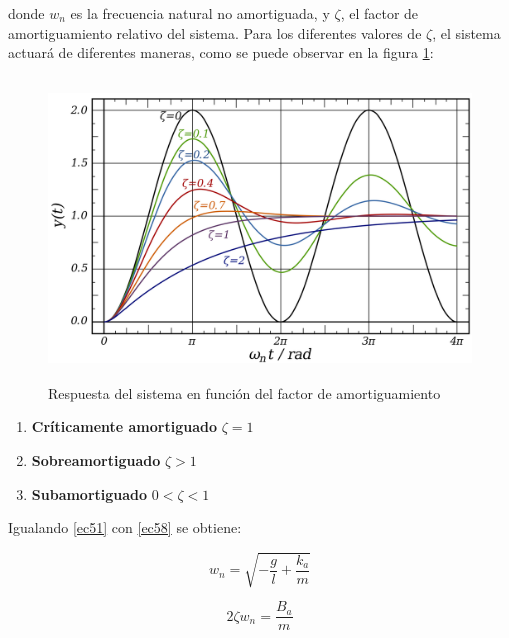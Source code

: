 \begin{itemize}
donde $w_{n}$ es la frecuencia natural no amortiguada, y $\zeta$, el factor de amortiguamiento relativo del sistema. Para los diferentes valores de $\zeta$, el sistema actuará de diferentes maneras, como se puede observar en la figura \ref{figura59}:

\begin{figure}[H]
\centering
\includegraphics[width=13cm, height=8cm]{imagenes/apartado_5/59_zeta_response_system}
\caption{Respuesta del sistema en función del factor de amortiguamiento}
\label{figura59}
\end{figure}


\begin{enumerate}

\item \textbf{Críticamente amortiguado} $\zeta = 1$

\item \textbf{Sobreamortiguado} $\zeta > 1$

\item \textbf{Subamortiguado} $0 < \zeta < 1$

\end{enumerate}

Igualando \ref{ec51} con \ref{ec58} se obtiene:

\begin{equation}
w_{n}=\sqrt{-\frac{g}{l}+\frac{k_a}{m}}
\label{ec59}
\end{equation}

\begin{equation}
2\zeta w_{n} = \frac{B_a}{m}
\label{ec510}
\end{equation}


\end{itemize}
